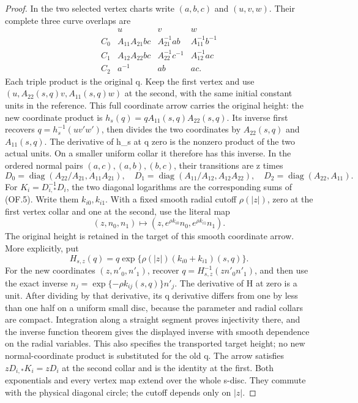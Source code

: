 \begin{proof}
In the two selected vertex charts write \((a,b,c)\) and
\((u,v,w)\). Their complete three curve overlaps are
\[
\begin{array}{c|ccc}
 &u&v&w\\\hline
 C_0&A_{11}A_{21}bc&A_{21}^{-1}ab&A_{11}^{-1}b^{-1}\\
 C_1&A_{12}A_{22}bc&A_{22}^{-1}c^{-1}&A_{12}^{-1}ac\\
 C_2&a^{-1}&ab&ac.
\end{array}                                               \tag{OF.6}
\]
Each triple product is the original q. Keep the first vertex and
use \((u,A_{22}(s,q)v,A_{11}(s,q)w)\) at the second, with the
same initial constant units in the reference. This full coordinate
arrow carries the original height: the new coordinate product is
\(h_s(q)=qA_{11}(s,q)A_{22}(s,q)\). Its inverse first recovers
\(q=h_s^{-1}(u v' w')\), then divides the two coordinates by
\(A_{22}(s,q)\) and \(A_{11}(s,q)\). The derivative of h\_s
at q zero is the nonzero product of the two actual units. On a
smaller uniform collar it therefore has this inverse. In the
ordered normal pairs
\((a,c),(a,b),(b,c)\), their transitions are z times
\[
 D_0=\operatorname{diag}(A_{22}/A_{21},A_{11}A_{21}),\quad
 D_1=\operatorname{diag}(A_{11}/A_{12},A_{12}A_{22}),\quad
 D_2=\operatorname{diag}(A_{22},A_{11}).              \tag{OF.7}
\]
For \(K_i=D_{i,*}^{-1}D_i\), the two diagonal logarithms are
the corresponding sums of (OF.5). Write them \(k_{i0},k_{i1}\).
With a fixed smooth radial cutoff \(\rho(|z|)\), zero at the
first vertex collar and one at the second, use the literal map
\[
 (z,n_0,n_1)\longmapsto
 (z,e^{\rho k_{i0}}n_0,e^{\rho k_{i1}}n_1).        \tag{OF.8}
\]
The original height is retained in the target of this smooth
coordinate arrow. More explicitly, put
\[
 H_{s,z}(q)=q\exp\{\rho(|z|)(k_{i0}+k_{i1})(s,q)\}.
\]
For the new coordinates \((z,n'_0,n'_1)\), recover
\(q=H_{s,z}^{-1}(z n'_0n'_1)\), and then use the exact inverse
\(n_j=\exp\{-\rho k_{ij}(s,q)\}n'_j\). The derivative of
H at zero is a unit. After dividing by that derivative, its
q derivative differs from one by less than one half on a
uniform small disc, because the parameter and radial collars
are compact. Integration along a straight segment proves
injectivity there, and the inverse function theorem gives
the displayed inverse with smooth dependence on the radial
variables. This also specifies the transported target height;
no new normal-coordinate product is substituted for the old q.
The arrow satisfies
\(zD_{i,*}K_i=zD_i\) at the second collar and is the identity
at the first. Both exponentials and every vertex map extend
over the whole s-disc. They commute with the physical diagonal
circle; the cutoff depends only on \(|z|\).


\end{proof}

